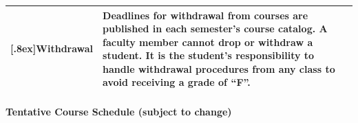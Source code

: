 \documentclass[10pt]{article}
\begin{document}
\begin{center}
\begin{tabular}{|p{} p{}|}
[.8ex]\textbf{Withdrawal} & Deadlines for withdrawal from courses are published in each semester's course catalog. A faculty member cannot drop or withdraw a student. It is the student's responsibility to handle withdrawal procedures from any class to avoid receiving a grade of ``F''. \\
\hline
\end{tabular}
\end{center}



\newpage
\paragraph{Tentative Course Schedule (subject to change)}
\end{document}
